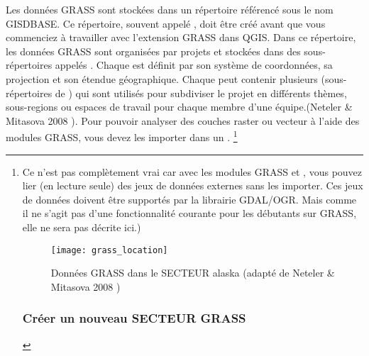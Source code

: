 Les donn\'ees GRASS sont stock\'ees dans un r\'epertoire r\'ef\'erenc\'e sous le nom GISDBASE. Ce r\'epertoire, souvent appel\'e , doit \^etre cr\'e\'e avant que vous commenciez \`a travailler avec l'extension GRASS dans QGIS. Dans ce r\'epertoire, les donn\'ees GRASS sont organis\'ees par projets et stock\'ees dans des sous-r\'epertoires appel\'es . Chaque  est d\'efinit par son syst\`eme de coordonn\'ees, sa projection et son \'etendue g\'eographique. Chaque  peut contenir plusieurs  (sous-r\'epertoires de ) qui sont utilis\'es pour subdiviser le projet en diff\'erents th\`emes, sous-regions ou espaces de travail pour chaque membre d'une \'equipe.(Neteler \& Mitasova 2008 \cite{neteler_mitasova08}). Pour pouvoir analyser des couches raster ou vecteur \`a l'aide des modules GRASS, vous devez les importer dans un . \footnote {Ce n'est pas compl\`etement vrai car avec les modules GRASS  et , vous pouvez lier (en lecture seule) des jeux de donn\'ees externes sans les importer. Ces jeux de donn\'ees doivent \^etre support\'es par la librairie GDAL/OGR. Mais comme il ne s'agit pas d'une fonctionnalit\'e courante pour les d\'ebutants sur GRASS, elle ne sera pas d\'ecrite ici.)

\begin{figure}[ht]
\begin{center}
\caption{Donn\'ees GRASS dans le SECTEUR alaska (adapt\'e de Neteler \& Mitasova 2008 \cite{neteler_mitasova08})}\label{fig:grass_location}\smallskip
\texttt{[image: grass\_location]}
\end{center}  
\end{figure}

\subsubsection{Cr\'eer un nouveau SECTEUR GRASS}\label{sec:create_loc}


}
